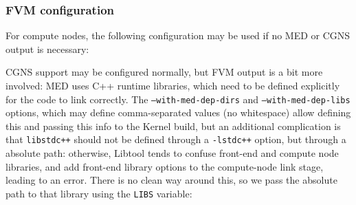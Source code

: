 \documentclass[a4paper,10pt,twoside]{article}
\begin{document}
\subsubsection{FVM configuration}

For compute nodes, the following configuration may be
used if no MED or CGNS output is necessary:


CGNS support may be configured normally, but FVM output is a bit more
involved: MED uses C++ runtime libraries, which need to be defined explicitly
for the code to link correctly. The \texttt{--with-med-dep-dirs}
and \texttt{--with-med-dep-libs} options, which may define comma-separated
values (no whitespace) allow defining this and passing this info to
the Kernel build, but an additional complication is that \texttt{libstdc++}
should not be defined through a \texttt{-lstdc++} option, but through
a absolute path: otherwise, Libtool tends to confuse front-end and compute
node libraries, and add front-end library options to the compute-node
link stage, leading to an error. There is no clean way around this,
so we pass the absolute path to that library using the \texttt{LIBS}
variable:
\end{document}
